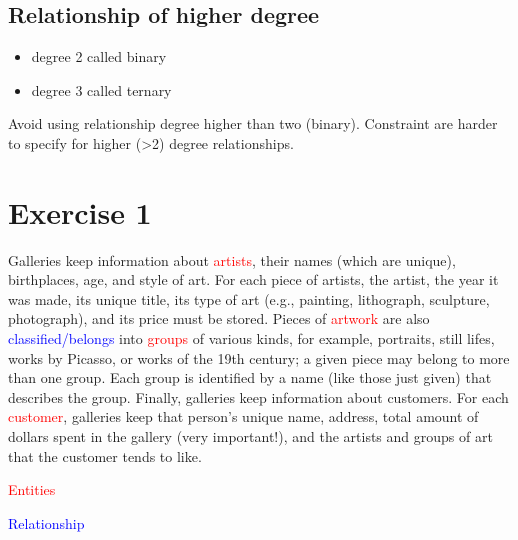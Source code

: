 

\subsection*{Relationship of higher degree}
\begin{itemize}
	\item degree 2 called binary
	\item degree 3 called  ternary
\end{itemize}
Avoid using relationship degree higher than two (binary). Constraint are harder to specify for higher (>2) degree relationships. 

\section{Exercise 1}
Galleries  keep  information  about  \textcolor{red}{artists},  their  names  (which  are  unique),  birthplaces,  age, 
and style of art. For each piece of artists, the artist, the year it was made, its unique title, its 
type  of  art  (e.g.,  painting,  lithograph,  sculpture, photograph),  and  its  price  must  be  stored. 
Pieces of \textcolor{red}{artwork} are also \textcolor{blue}{classified/belongs} into \textcolor{red}{groups} of various kinds, for example, portraits, still 
lifes, works by Picasso, or works of the 19th century; a given piece may belong to more than 
one group. Each group is identified by a name (like those just given) that describes the group. 
Finally,  galleries  keep  information  about  customers.  For  each  \textcolor{red}{customer},  galleries  keep  that 
person’s unique name, address, total amount of dollars spent in the gallery (very important!), 
and the artists and groups of art that the customer tends to like. 

\textcolor{red}{Entities}

\textcolor{blue}{Relationship}










